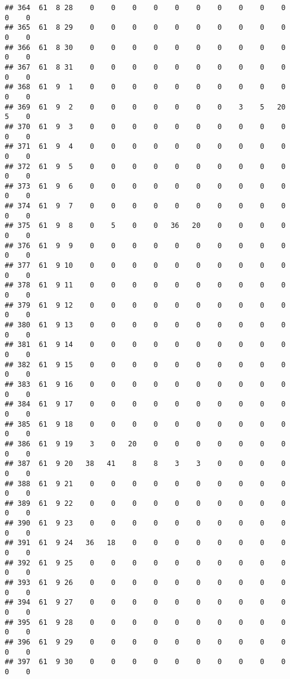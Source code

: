 \documentclass[]{article}
\begin{document}
\begin{verbatim}
## 364  61  8 28    0    0    0    0    0    0    0    0    0    0    0    0
## 365  61  8 29    0    0    0    0    0    0    0    0    0    0    0    0
## 366  61  8 30    0    0    0    0    0    0    0    0    0    0    0    0
## 367  61  8 31    0    0    0    0    0    0    0    0    0    0    0    0
## 368  61  9  1    0    0    0    0    0    0    0    0    0    0    0    0
## 369  61  9  2    0    0    0    0    0    0    0    3    5   20    5    0
## 370  61  9  3    0    0    0    0    0    0    0    0    0    0    0    0
## 371  61  9  4    0    0    0    0    0    0    0    0    0    0    0    0
## 372  61  9  5    0    0    0    0    0    0    0    0    0    0    0    0
## 373  61  9  6    0    0    0    0    0    0    0    0    0    0    0    0
## 374  61  9  7    0    0    0    0    0    0    0    0    0    0    0    0
## 375  61  9  8    0    5    0    0   36   20    0    0    0    0    0    0
## 376  61  9  9    0    0    0    0    0    0    0    0    0    0    0    0
## 377  61  9 10    0    0    0    0    0    0    0    0    0    0    0    0
## 378  61  9 11    0    0    0    0    0    0    0    0    0    0    0    0
## 379  61  9 12    0    0    0    0    0    0    0    0    0    0    0    0
## 380  61  9 13    0    0    0    0    0    0    0    0    0    0    0    0
## 381  61  9 14    0    0    0    0    0    0    0    0    0    0    0    0
## 382  61  9 15    0    0    0    0    0    0    0    0    0    0    0    0
## 383  61  9 16    0    0    0    0    0    0    0    0    0    0    0    0
## 384  61  9 17    0    0    0    0    0    0    0    0    0    0    0    0
## 385  61  9 18    0    0    0    0    0    0    0    0    0    0    0    0
## 386  61  9 19    3    0   20    0    0    0    0    0    0    0    0    0
## 387  61  9 20   38   41    8    8    3    3    0    0    0    0    0    0
## 388  61  9 21    0    0    0    0    0    0    0    0    0    0    0    0
## 389  61  9 22    0    0    0    0    0    0    0    0    0    0    0    0
## 390  61  9 23    0    0    0    0    0    0    0    0    0    0    0    0
## 391  61  9 24   36   18    0    0    0    0    0    0    0    0    0    0
## 392  61  9 25    0    0    0    0    0    0    0    0    0    0    0    0
## 393  61  9 26    0    0    0    0    0    0    0    0    0    0    0    0
## 394  61  9 27    0    0    0    0    0    0    0    0    0    0    0    0
## 395  61  9 28    0    0    0    0    0    0    0    0    0    0    0    0
## 396  61  9 29    0    0    0    0    0    0    0    0    0    0    0    0
## 397  61  9 30    0    0    0    0    0    0    0    0    0    0    0    0

\end{verbatim}
\end{document}
